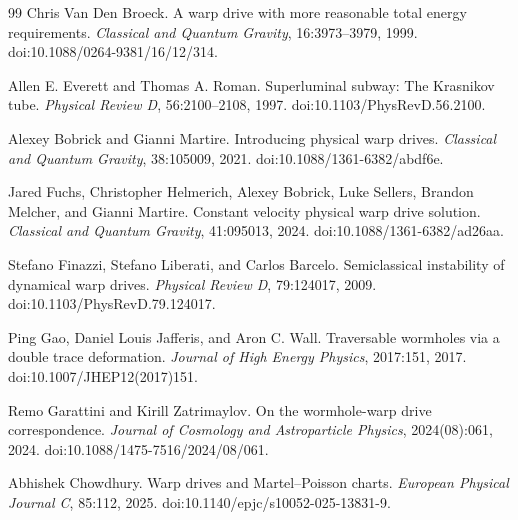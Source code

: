 \documentclass[11pt]{article}
\begin{document}
\begin{thebibliography}{99}
Chris Van Den Broeck.
\newblock A warp drive with more reasonable total energy requirements.
\newblock \emph{Classical and Quantum Gravity}, 16:3973--3979, 1999. doi:10.1088/0264-9381/16/12/314.

Allen E. Everett and Thomas A. Roman.
\newblock Superluminal subway: The Krasnikov tube.
\newblock \emph{Physical Review D}, 56:2100--2108, 1997. doi:10.1103/PhysRevD.56.2100.

Alexey Bobrick and Gianni Martire.
\newblock Introducing physical warp drives.
\newblock \emph{Classical and Quantum Gravity}, 38:105009, 2021. doi:10.1088/1361-6382/abdf6e.

Jared Fuchs, Christopher Helmerich, Alexey Bobrick, Luke Sellers, Brandon Melcher, and Gianni Martire.
\newblock Constant velocity physical warp drive solution.
\newblock \emph{Classical and Quantum Gravity}, 41:095013, 2024. doi:10.1088/1361-6382/ad26aa.

Stefano Finazzi, Stefano Liberati, and Carlos Barcelo.
\newblock Semiclassical instability of dynamical warp drives.
\newblock \emph{Physical Review D}, 79:124017, 2009. doi:10.1103/PhysRevD.79.124017.

Ping Gao, Daniel Louis Jafferis, and Aron C. Wall.
\newblock Traversable wormholes via a double trace deformation.
\newblock \emph{Journal of High Energy Physics}, 2017:151, 2017. doi:10.1007/JHEP12(2017)151.

Remo Garattini and Kirill Zatrimaylov.
\newblock On the wormhole-warp drive correspondence.
\newblock \emph{Journal of Cosmology and Astroparticle Physics}, 2024(08):061, 2024. doi:10.1088/1475-7516/2024/08/061.

Abhishek Chowdhury.
\newblock Warp drives and Martel--Poisson charts.
\newblock \emph{European Physical Journal C}, 85:112, 2025. doi:10.1140/epjc/s10052-025-13831-9.

\end{thebibliography}
\end{document}
